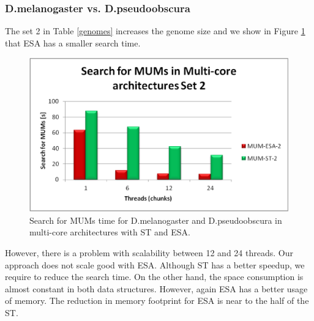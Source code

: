 \documentclass[runningheads,a5paper]{llncs}
\begin{document}
\subsubsection{D.melanogaster vs. D.pseudoobscura}
The set 2 in Table \ref{genomes} increases the genome size and we show in Figure \ref{fig:fly-mum} that ESA has a smaller search time.
 \begin{figure}[!h]
  \centering
  \includegraphics[scale=0.3]{fly-MUM.eps}
  \caption{Search for MUMs time for D.melanogaster and D.pseudoobscura in multi-core architectures with ST and ESA.}
  \label{fig:fly-mum}
\end{figure}  
However, there is a problem with scalability between 12 and 24 threads. Our approach does not scale good with ESA. Although ST has a better speedup, we require to reduce the search time.
On the other hand, the space consumption is almost constant in both data structures. However, again ESA has a better usage of memory. The reduction in memory footprint for ESA is near to the half of the ST.%
\end{document}
